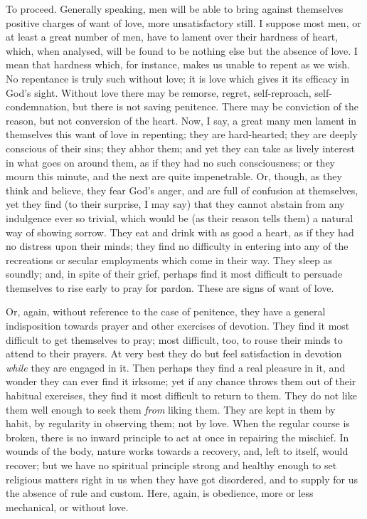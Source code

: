 To proceed. Generally speaking, men will be able to bring against
themselves positive charges of want of love, more unsatisfactory
still. I suppose most men, or at least a great number of men, have to
lament over their hardness of heart, which, when analysed, will be
found to be nothing else but the absence of love. I mean that hardness
which, for instance, makes us unable to repent as we wish. No
repentance is truly such without love; it is love which gives it its
efficacy in God's sight. Without love there may be remorse, regret,
self-reproach, self-condemnation, but there is not saving penitence.
There may be conviction of the reason, but not conversion of the
heart. Now, I say, a great many men lament in themselves this want of
love in repenting; they are hard-hearted; they are deeply conscious of
their sins; they abhor them; and yet they can take as lively interest
in what goes on around them, as if they had no such consciousness; or
they mourn this minute, and the next are quite impenetrable. Or,
though, as they think and believe, they fear God's anger, and are full
of confusion at themselves, yet they find (to their surprise, I may
say) that they cannot abstain from any indulgence ever so trivial,
which would be (as their reason tells them) a natural way of showing
sorrow. They eat and drink with as good a heart, as if they had no
distress upon their minds; they find no difficulty in entering into
any of the recreations or secular employments which come in their way.
They sleep as soundly; and, in spite of their grief, perhaps find it
most difficult to persuade themselves to rise early to pray for
pardon. These are signs of want of love.

Or, again, without reference to the case of penitence, they have a
general indisposition towards prayer and other exercises of devotion.
They find it most difficult to get themselves to pray; most difficult,
too, to rouse their minds to attend to their prayers. At very best
they do but feel satisfaction in devotion \emph{while} they are
engaged in it. Then perhaps they find a real pleasure in it, and
wonder they can ever find it irksome; yet if any chance throws them
out of their habitual exercises, they find it most difficult to return
to them. They do not like them well enough to seek them \emph{from}
liking them. They are kept in them by habit, by regularity in
observing them; not by love. When the regular course is broken, there
is no inward principle to act at once in repairing the mischief. In
wounds of the body, nature works towards a recovery, and, left to
itself, would recover; but we have no spiritual principle strong and
healthy enough to set religious matters right in us when they have got
disordered, and to supply for us the absence of rule and custom. Here,
again, is obedience, more or less mechanical, or without love.

